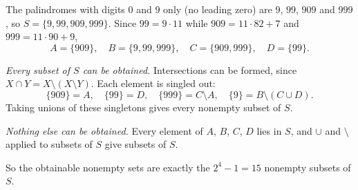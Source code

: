 The palindromes with digits $0$ and $9$ only (no leading zero) are $9$, $99$, $909$ and $999$, so $S=\{9,99,909,999\}$. Since $99=9\cdot11$ while $909=11\cdot82+7$ and $999=11\cdot90+9$,
\[A=\{909\},\quad B=\{9,99,999\},\quad C=\{909,999\},\quad D=\{99\}.\]

\emph{Every subset of $S$ can be obtained.} Intersections can be formed, since $X\cap Y=X\setminus(X\setminus Y)$. Each element is singled out:
\[\{909\}=A,\quad\{99\}=D,\quad\{999\}=C\setminus A,\quad\{9\}=B\setminus(C\cup D).\]
Taking unions of these singletons gives every nonempty subset of $S$.

\emph{Nothing else can be obtained.} Every element of $A$, $B$, $C$, $D$ lies in $S$, and $\cup$ and $\setminus$ applied to subsets of $S$ give subsets of $S$.

So the obtainable nonempty sets are exactly the $2^4-1=\boxed{15}$ nonempty subsets of $S$.
